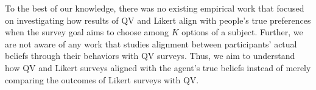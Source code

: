To the best of our knowledge, there was no existing empirical work that focused on investigating how results of QV and Likert align with people’s true preferences when the survey goal aims to choose among $K$ options of a subject. Further, we are not aware of any work that studies alignment between participants' actual beliefs through their behaviors with QV surveys. Thus, we aim to understand how QV and Likert surveys aligned with the agent's true beliefs instead of merely comparing the outcomes of Likert surveys with QV. 
























